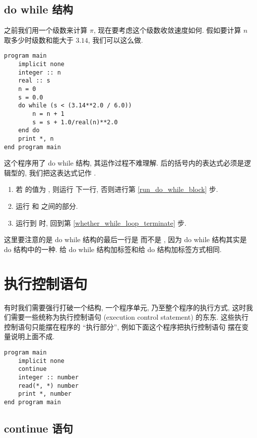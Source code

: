 \subsection{do while 结构}

之前我们用一个级数来计算 $\pi$, 现在要考虑这个级数收敛速度如何. 假如要计算 $n$ 取多少时级数和能大于 $3.14$, 我们可以这么做.
\begin{lstlisting}
program main
    implicit none
    integer :: n
    real :: s
    n = 0
    s = 0.0
    do while (s < (3.14**2.0 / 6.0))
        n = n + 1
        s = s + 1.0/real(n)**2.0
    end do
    print *, n
end program main
\end{lstlisting}
这个程序用了 do while 结构, 其运作过程不难理解.  后的括号内的表达式必须是逻辑型的, 我们把这表达式记作 .
\begin{enumerate}
    \item 若  的值为 , 则运行  下一行, 否则进行第 \ref{run_do_while_block} 步.\label{whether_while_loop_terminate}
    \item 运行  和  之间的部分.\label{run_do_while_block}
    \item 运行到  时, 回到第 \ref{whether_while_loop_terminate} 步.
\end{enumerate}

这里要注意的是 do while 结构的最后一行是  而不是 , 因为 do while 结构其实是 do 结构中的一种. 给 do while 结构加标签和给 do 结构加标签方式相同.

\section{执行控制语句}

有时我们需要强行打破一个结构, 一个程序单元, 乃至整个程序的执行方式, 这时我们需要一些统称为执行控制语句 (execution control statement) 的东东. 这些执行控制语句只能摆在程序的 ``执行部分'', 例如下面这个程序把执行控制语句  摆在变量说明上面不成.
\begin{lstlisting}
program main
    implicit none
    continue
    integer :: number
    read(*, *) number
    print *, number
end program main
\end{lstlisting}

\subsection{continue 语句}

